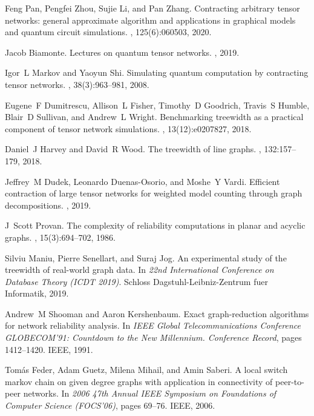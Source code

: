 \documentclass[12pt,twocolumn]{article}
\begin{document}
{\begin{thebibliography}{10}
Feng Pan, Pengfei Zhou, Sujie Li, and Pan Zhang.
\newblock Contracting arbitrary tensor networks: general approximate algorithm
  and applications in graphical models and quantum circuit simulations.
, 125(6):060503, 2020.

Jacob Biamonte.
\newblock Lectures on quantum tensor networks.
, 2019.

Igor~L Markov and Yaoyun Shi.
\newblock Simulating quantum computation by contracting tensor networks.
, 38(3):963--981, 2008.

Eugene~F Dumitrescu, Allison~L Fisher, Timothy~D Goodrich, Travis~S Humble,
  Blair~D Sullivan, and Andrew~L Wright.
\newblock Benchmarking treewidth as a practical component of tensor network
  simulations.
, 13(12):e0207827, 2018.

Daniel~J Harvey and David~R Wood.
\newblock The treewidth of line graphs.
, 132:157--179, 2018.

Jeffrey~M Dudek, Leonardo Duenas-Osorio, and Moshe~Y Vardi.
\newblock Efficient contraction of large tensor networks for weighted model
  counting through graph decompositions.
, 2019.

J~Scott Provan.
\newblock The complexity of reliability computations in planar and acyclic
  graphs.
, 15(3):694--702, 1986.

Silviu Maniu, Pierre Senellart, and Suraj Jog.
\newblock An experimental study of the treewidth of real-world graph data.
\newblock In {\em 22nd International Conference on Database Theory (ICDT
  2019)}. Schloss Dagstuhl-Leibniz-Zentrum fuer Informatik, 2019.

Andrew~M Shooman and Aaron Kershenbaum.
\newblock Exact graph-reduction algorithms for network reliability analysis.
\newblock In {\em IEEE Global Telecommunications Conference GLOBECOM'91:
  Countdown to the New Millennium. Conference Record}, pages 1412--1420. IEEE,
  1991.

Tom{\'a}s Feder, Adam Guetz, Milena Mihail, and Amin Saberi.
\newblock A local switch markov chain on given degree graphs with application
  in connectivity of peer-to-peer networks.
\newblock In {\em 2006 47th Annual IEEE Symposium on Foundations of Computer
  Science (FOCS'06)}, pages 69--76. IEEE, 2006.


\end{thebibliography}}
\end{document}
